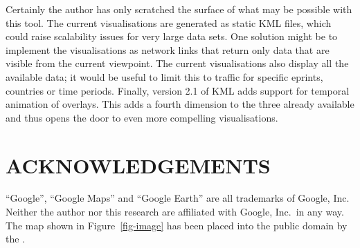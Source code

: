 \documentclass[10pt]{article}
\begin{document}
Certainly the author has only scratched the surface of what may be possible with this tool. The current visualisations are generated as static KML files, which could raise scalability issues for very large data sets. One solution might be to implement the visualisations as network links that return only data that are visible from the current viewpoint. The current visualisations also display all the available data; it would be useful to limit this to traffic for specific eprints, countries or time periods. Finally, version 2.1 of KML adds support for temporal animation of overlays. This adds a fourth dimension to the three already available and thus opens the door to even more compelling visualisations.


\section*{ACKNOWLEDGEMENTS}

``Google'', ``Google Maps'' and ``Google Earth'' are all trademarks of Google, Inc. Neither the author nor this research are affiliated with Google, Inc.\ in any way. The map shown in Figure~\ref{fig-image} has been placed into the public domain by the .




\end{document}
